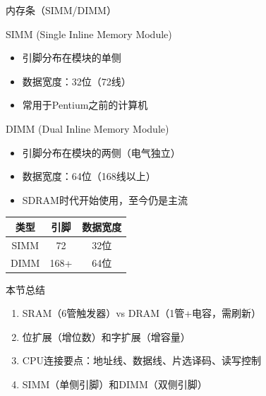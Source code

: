 \documentclass[10pt, aspectratio=169]{beamer}
\begin{document}
\begin{frame}{内存条（SIMM/DIMM）}
    \begin{block}{SIMM (Single Inline Memory Module)}
        \begin{itemize}
            \item 引脚分布在模块的单侧
            \item 数据宽度：32位（72线）
            \item 常用于Pentium之前的计算机
        \end{itemize}
    \end{block}
    \begin{block}{DIMM (Dual Inline Memory Module)}
        \begin{itemize}
            \item 引脚分布在模块的两侧（电气独立）
            \item 数据宽度：64位（168线以上）
            \item SDRAM时代开始使用，至今仍是主流
        \end{itemize}
    \end{block}
    \vspace{0.3em}
    \begin{center}
        \begin{tabular}{|c|c|c|}
            \hline
            \textbf{类型} & \textbf{引脚} & \textbf{数据宽度} \\
            \hline
            SIMM & 72 & 32位 \\
            \hline
            DIMM & 168+ & 64位 \\
            \hline
        \end{tabular}
    \end{center}
\end{frame}

\begin{frame}{本节总结}
    \begin{enumerate}
        \item SRAM（6管触发器）vs DRAM（1管+电容，需刷新）
        \item 位扩展（增位数）和字扩展（增容量）
        \item CPU连接要点：地址线、数据线、片选译码、读写控制
        \item SIMM（单侧引脚）和DIMM（双侧引脚）
    \end{enumerate}
\end{frame}
\end{document}
